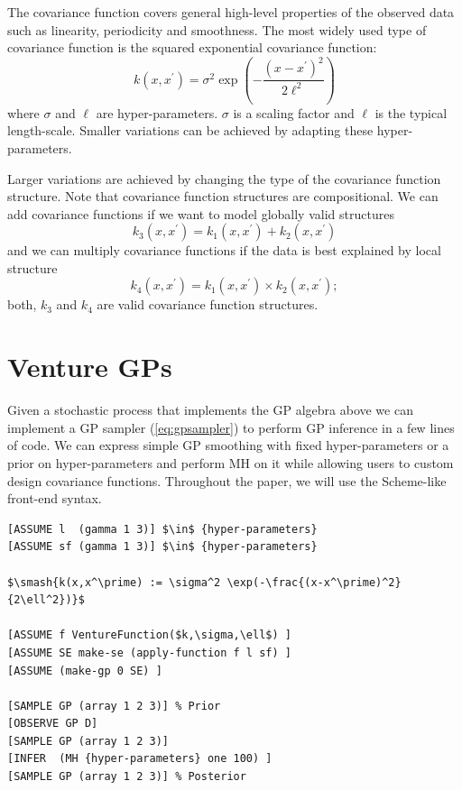 \documentclass{article} %
\begin{document}
The covariance function covers general high-level properties of the observed data such as linearity, periodicity and smoothness. The most widely used type of covariance function is the squared exponential covariance function:
\begin{equation}
k(x,x^\prime) = \sigma^2 \exp(-\frac{(x-x^\prime)^2}{2\ell^2})
\end{equation}
where $\sigma$ and $\ell$ are hyper-parameters. $\sigma$ is a scaling factor and $\ell$ is the typical length-scale.
Smaller variations can be achieved by adapting these hyper-parameters. 


Larger variations are achieved by changing the type of the covariance function structure. 
Note that covariance function structures are compositional. We can add covariance functions if we want to model globally valid structures
\begin{equation}
k_3(x,x^\prime) = k_1(x,x^\prime) + k_2(x,x^\prime)
\end{equation}
 and we can multiply covariance functions if the data is best explained by local structure 
\begin{equation}
k_4(x,x^\prime) = k_1(x,x^\prime) \times k_2(x,x^\prime);
\end{equation}
both, $k_3$ and $k_4$ are valid covariance function structures.
\section{Venture GPs}
Given a stochastic process that implements the GP algebra above we can implement a GP sampler (\ref{eq:gpsampler}) to perform GP inference in a few lines of code. We can express simple GP smoothing with fixed hyper-parameters or a prior on hyper-parameters and perform MH on it while allowing users to custom design covariance functions. Throughout the paper, we will use the Scheme-like front-end syntax. 
\begin{minipage}{\linewidth}
\footnotesize
\belowcaptionskip=-10pt
\begin{lstlisting}[frame=single,caption=Bayesian GP Smoothing,mathescape,label=alg:gpNeal]
[ASSUME l  (gamma 1 3)] $\in$ {hyper-parameters} 
[ASSUME sf (gamma 1 3)] $\in$ {hyper-parameters}

$\smash{k(x,x^\prime) := \sigma^2 \exp(-\frac{(x-x^\prime)^2}{2\ell^2})}$

[ASSUME f VentureFunction($k,\sigma,\ell$) ]
[ASSUME SE make-se (apply-function f l sf) ]
[ASSUME (make-gp 0 SE) ]

[SAMPLE GP (array 1 2 3)] % Prior
[OBSERVE GP D]
[SAMPLE GP (array 1 2 3)] 
[INFER  (MH {hyper-parameters} one 100) ]
[SAMPLE GP (array 1 2 3)] % Posterior

\end{lstlisting}
\end{minipage}
\end{document}
